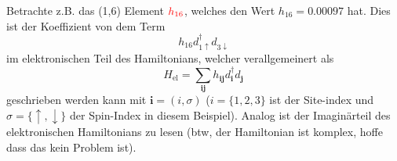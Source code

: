 \documentclass{article}
\renewcommand{\vec}[1]{\mathbf{#1}}
\newcommand{\pdagger}{{\phantom{\dagger}}}
\begin{document}
Betrachte z.B. das (1,6) Element ${\color{red}h_{16}}$, welches den Wert $h_{16} = 0.00097$ hat. Dies ist der Koeffizient von dem Term
\begin{equation}
	h_{16}d_{1\uparrow}^\dagger d_{3\downarrow}^\pdagger 
\end{equation} 
im elektronischen Teil des Hamiltonians, welcher verallgemeinert als 
\begin{equation}
	H_\mathrm{el} = \sum_{\vec{i}\vec{j}}h_{\vec{i}\vec{j}}^\pdagger d_\vec{i}^\dagger d_\vec{j}^\pdagger
\end{equation}
geschrieben werden kann mit $\vec{i}=(i,\sigma)$ ($i=\{1,2,3\}$ ist der Site-index und $\sigma=\{\uparrow,\downarrow\}$ der Spin-Index in diesem Beispiel).
Analog ist der Imaginärteil des elektronischen Hamiltonians zu lesen (btw, der Hamiltonian ist komplex, hoffe dass das kein Problem ist).
\end{document}
